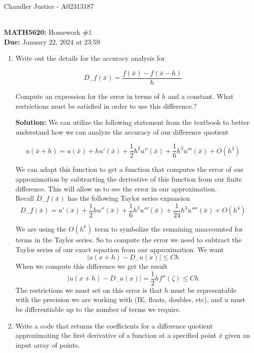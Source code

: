 \documentclass[10pt]{article}
\begin{document}
\begin{flushright}
Chandler Justice - A02313187
\end{flushright}
\noindent \underline{\hspace{3in}}\\

\textbf{MATH5620:} Homework \#1\\
\textbf{Due:} January 22, 2024 at 23:59\\

\begin{enumerate}
\item Write out the details for the accuracy analysis for

$$
  D_- f(\bar{x}) = \frac{f(\bar{x})-f(\bar{x}-h)}{h}
$$

Compute an expression for the error in terms of $h$ and a constant. What
restrictions must be satisfied in order to use this difference.?

\textbf{Solution:} We can utilize the following statement from the textbook to better understand how we can analyze the accuracy of our difference quotient

\[u(\bar{x} + h) = u(\bar{x}) + hu'(\bar{x}) + \frac{1}{2}h^2u''(\bar{x}) + \frac{1}{6}h^3u'''(\bar{x}) + O(h^4)\]

We can adapt this function to get a function that computes the error of our approximation by subtracting the derivative of this function from our finite difference. This will allow us to see the error in our approximation.\\

Recall $D_{-}f(\bar{x})$ has the following Taylor series expansion
\[D_{-}f(\bar{x}) = u'(\bar{x}) + \frac{1}{2}hu''(\bar{x}) + \frac{1}{6}h^2u'''(\bar{x}) + \frac{1}{24}h^3u''''(\bar{x}) + O(h^4)\]

We are using the $O(h^k)$ term to symbolize the remaining unaccounted for terms in the Taylor series. So to compute the error we need to subtract the Taylor series of our exact equation from our approximation. We want
\[|u(x + h) - D_{-}u(x)|  \leq Ch\]
When we compute this difference we get the result
\[\boxed{|u(x + h) - D_{-}u(x)| = \frac{1}{2}hf''(\zeta) \leq Ch}\]
The restrictions we must set on this error is that $h$ must be representable with the precision we are working with (IE, floats, doubles, etc), and $u$ must be differentiable up to the number of terms we require.

\item Write a code that returns the coefficients for a difference quotient
   approximating the first derivative of a function at a specified point
   $\bar{x}$ given an input array of points.



\end{enumerate}
\end{document}
